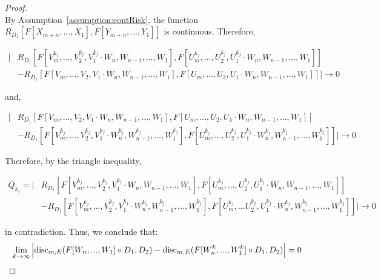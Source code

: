 \documentclass{article} %
\newcommand{\disc}{\textnormal{disc}}
\begin{document}
\begin{proof}
\begin{equation}
\end{equation}
By Assumption~\ref{assumption:contRisk}, the function $R_{D_1}\left [F[X_{m+n},...,X_1] ,F[Y_{m+n},...,Y_1] \right]$ is continuous. Therefore,
\begin{small}
\begin{equation}
\begin{aligned}
\Big\vert &R_{D_1}\left[ F[V^{k_j}_m,...,V^{k_j}_2,V^{k_j}_1\cdot W_{n},W_{n-1},...,W_1],F[U^{k_j}_m,...,U^{k_j}_2,U^{k_j}_1\cdot W_{n},W_{n-1},...,W_1] \right] \\
& - R_{D_1}\left[ F[V_m,...,V_2,V_1\cdot W_{n},W_{n-1},...,W_1], F[U_m,...,U_2,U_1\cdot W_{n},W_{n-1},...,W_1] \right] \Big\vert \to 0
\end{aligned}
\end{equation}
\end{small}
and,
\begin{small}
\begin{equation}
\begin{aligned}
\Big\vert &R_{D_1}\left[ F[V_m,...,V_2,V_1\cdot W_{n},W_{n-1},...,W_1] ,F[U_m,...,U_2,U_1\cdot W_{n},W_{n-1},...,W_1] \right] \\
& - R_{D_1} \left[ F[V^{k_j}_m,...,V^{k_j}_2,V^{k_j}_1\cdot W^{k_j}_{n},W^{k_j}_{n-1},...,W^{k_j}_1], F[U^{k_j}_m,...,U^{k_j}_2,U^{k_j}_1\cdot W^{k_j}_{n},W^{k_j}_{n-1},...,W^{k_j}_1] \right] \Big\vert \to 0
\end{aligned}
\end{equation}
\end{small}
Therefore, by the triangle inequality,
\begin{small}
\begin{equation}
\begin{aligned}
Q_{k_j} = \Big\vert &R_{D_1}\left [ F[V^{k_j}_m,...,V^{k_j}_2,V^{k_j}_1\cdot W_{n},W_{n-1},...,W_1] ,F[U^{k_j}_m,...,U^{k_j}_2,U^{k_j}_1\cdot W_{n},W_{n-1},...,W_1]\right] \\
& - R_{D_1}\left[F[V^{k_j}_m,...,V^{k_j}_2,V^{k_j}_1\cdot W^{k_j}_{n},W^{k_j}_{n-1},...,W^{k_j}_1], F[U^{k_j}_m,...U^{k_j}_{2},U^{k_j}_1\cdot W^{k_j}_{n},W^{k_j}_{n-1},...,W^{k_j}_1] \right] \Big\vert \to 0
\end{aligned}
\end{equation}
\end{small}
in contradiction. Thus, we conclude that:
\begin{equation}
\lim_{k\to \infty}\Big\vert \disc_{m,E}( F[W_{n},...,W_1] \circ D_1,D_2) - \disc_{m,E}( F[W^k_{n},...,W^k_1] \circ D_1,D_2) \Big\vert = 0
\end{equation}
\end{proof}
\end{document}
